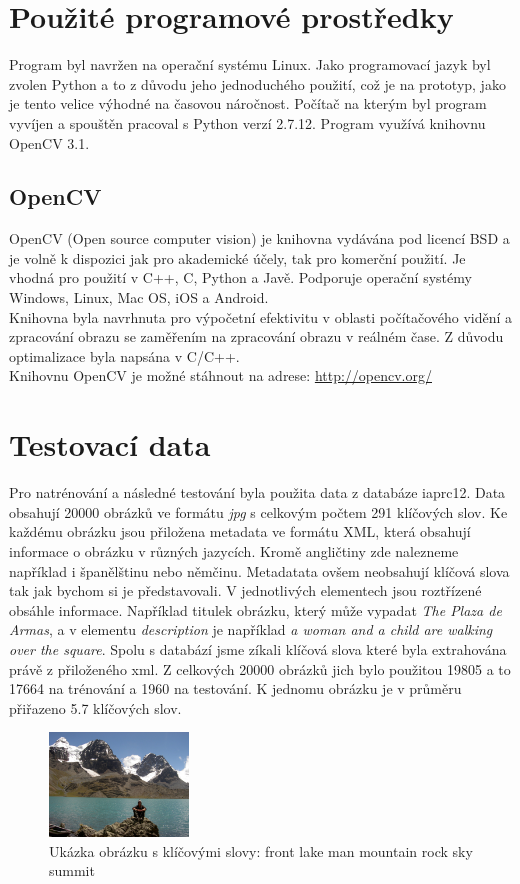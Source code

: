 \documentclass{report}
\begin{document}
\chapter{Použité programové prostředky}
Program byl navržen na operační systému Linux. Jako programovací jazyk byl zvolen Python a to z důvodu jeho jednoduchého použití, což je na prototyp, jako je tento velice výhodné na časovou náročnost. Počítač na kterým byl program vyvíjen a spouštěn pracoval s Python verzí 2.7.12. Program využívá knihovnu OpenCV 3.1. 
  
\section{OpenCV}
OpenCV (Open source computer vision) je knihovna vydávána pod licencí BSD a je volně k dispozici jak pro akademické účely, tak pro komerční použití. Je vhodná pro použití v C++, C, Python a Javě. Podporuje operační systémy Windows, Linux, Mac OS, iOS a Android.
\\
Knihovna byla navrhnuta pro výpočetní efektivitu v oblasti počítačového vidění a zpracování obrazu se zaměřením na zpracování obrazu v reálném čase. Z důvodu optimalizace byla napsána v C/C++. 
\\
Knihovnu OpenCV je možné stáhnout na adrese: \url{http://opencv.org/}  

\chapter{Testovací data}
Pro natrénování a následné testování byla použita data z databáze iaprc12. Data obsahují \num{20 000} obrázků ve formátu \textit{jpg} s celkovým počtem 291 klíčových slov. Ke každému obrázku jsou přiložena metadata ve formátu XML, která obsahují informace o obrázku v různých jazycích. Kromě angličtiny zde nalezneme například i španělštinu nebo němčinu. Metadatata ovšem neobsahují klíčová slova tak jak bychom si je představovali. V jednotlivých elementech jsou roztřízené obsáhle informace. Například titulek obrázku, který může vypadat \textit{The Plaza de Armas}, a v elementu \textit{description} je například \textit{a woman and a child are walking over the square}. Spolu s databází jsme zíkali klíčová slova které byla extrahována právě z přiloženého xml. Z celkových \num{20 000} obrázků jich bylo použitou \num{19 805} a to \num{17 664} na trénování a \num{1 960} na testování. K jednomu obrázku je v průměru přiřazeno 5.7 klíčových slov.

\begin{figure}[h]
		\centering
		\includegraphics[width=140px]{./img/iaprtc12.jpg}	
		\caption{Ukázka obrázku s klíčovými slovy: front lake man mountain rock sky summit}
\end{figure}
 
\end{document}
